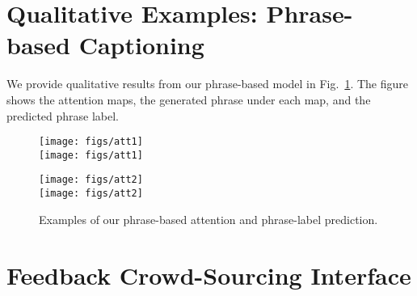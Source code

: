 \appendix 

\vspace{-1mm}
\section{Qualitative Examples: Phrase-based Captioning}
\vspace{-2mm}

We provide qualitative results from our phrase-based model in Fig.~\ref{fig:phrasemodelexamples}. The figure shows the attention maps, the generated phrase under each map, and the predicted phrase label.%

\begin{figure}[H]
\vspace{-0mm}
\centering
\begin{minipage}{0.82\linewidth}
  \texttt{[image: figs/att1]}\\[-6mm]
  \texttt{[image: figs/att1]}\\[-6mm]
  \end{minipage}
  \begin{minipage}{0.72\linewidth}
  \texttt{[image: figs/att2]}\\[-6mm]
  \texttt{[image: figs/att2]}
  \end{minipage}
  \vspace{-3mm}
  \caption{\small Examples of our phrase-based attention and phrase-label prediction.}
  \label{fig:phrasemodelexamples}
\end{figure}


\vspace{-4mm}
\section{Feedback Crowd-Sourcing Interface}
\vspace{-2mm}


